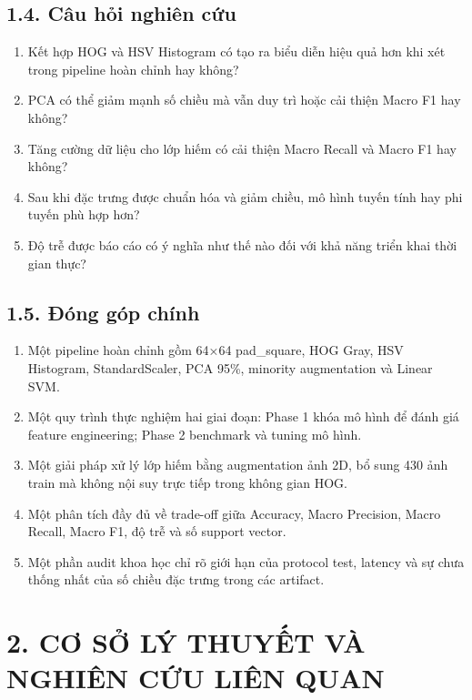 \documentclass[12pt,a4paper]{article}
\begin{document}
\subsection{1.4. Câu hỏi nghiên
cứu}\label{cuxe2u-hux1ecfi-nghiuxean-cux1ee9u}

\begin{enumerate}
\def\labelenumi{\arabic{enumi}.}
\item
  Kết hợp HOG và HSV Histogram có tạo ra biểu diễn hiệu quả hơn khi xét
  trong pipeline hoàn chỉnh hay không?
\item
  PCA có thể giảm mạnh số chiều mà vẫn duy trì hoặc cải thiện Macro F1
  hay không?
\item
  Tăng cường dữ liệu cho lớp hiếm có cải thiện Macro Recall và Macro F1
  hay không?
\item
  Sau khi đặc trưng được chuẩn hóa và giảm chiều, mô hình tuyến tính hay
  phi tuyến phù hợp hơn?
\item
  Độ trễ được báo cáo có ý nghĩa như thế nào đối với khả năng triển khai
  thời gian thực?
\end{enumerate}

\subsection{1.5. Đóng góp chính}\label{ux111uxf3ng-guxf3p-chuxednh}

\begin{enumerate}
\def\labelenumi{\arabic{enumi}.}
\setcounter{enumi}{5}
\item
  Một pipeline hoàn chỉnh gồm 64×64 pad\_square, HOG Gray, HSV
  Histogram, StandardScaler, PCA 95\%, minority augmentation và Linear
  SVM.
\item
  Một quy trình thực nghiệm hai giai đoạn: Phase 1 khóa mô hình để đánh
  giá feature engineering; Phase 2 benchmark và tuning mô hình.
\item
  Một giải pháp xử lý lớp hiếm bằng augmentation ảnh 2D, bổ sung 430 ảnh
  train mà không nội suy trực tiếp trong không gian HOG.
\item
  Một phân tích đầy đủ về trade-off giữa Accuracy, Macro Precision,
  Macro Recall, Macro F1, độ trễ và số support vector.
\item
  Một phần audit khoa học chỉ rõ giới hạn của protocol test, latency và
  sự chưa thống nhất của số chiều đặc trưng trong các artifact.
\end{enumerate}

\section{2. CƠ SỞ LÝ THUYẾT VÀ NGHIÊN CỨU LIÊN
QUAN}\label{cux1a1-sux1edf-luxfd-thuyux1ebft-vuxe0-nghiuxean-cux1ee9u-liuxean-quan}
\end{document}
